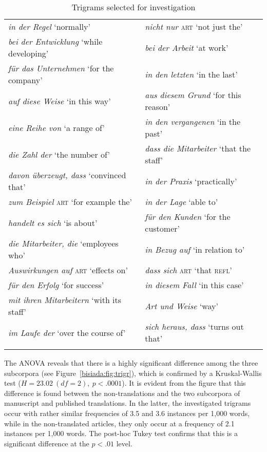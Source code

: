 \documentclass[output=paper]{LSP/langsci}
\begin{document}
\begin{table}
  \caption{Trigrams selected for investigation}\label{bisiada:tab:tgrtab}
  \begin{tabular}{ll}
    \lsptoprule
    \emph{in der Regel} `normally'                      & \emph{nicht nur} \textsc{art} `not just the'\\
    \emph{bei der Entwicklung} `while developing'       & \emph{bei der Arbeit} `at work'\\
    \emph{für das Unternehmen}  `for the company'       & \emph{in den letzten} `in the last'\\
    \emph{auf diese Weise} `in this way'                & \emph{aus diesem Grund} `for this reason'\\
    \emph{eine Reihe von} `a range of'                  & \emph{in den vergangenen} `in the past'\\
    \emph{die Zahl der} `the number of'                 & \emph{dass die Mitarbeiter} `that the staff'\\
    \emph{davon überzeugt, dass} `convinced that'       & \emph{in der Praxis} `practically'\\
    \emph{zum Beispiel} \textsc{art} `for example the'  & \emph{in der Lage} `able to'\\
    \emph{handelt es sich} `is about'                   & \emph{für den Kunden} `for the customer'\\
    \emph{die Mitarbeiter, die} `employees who'         & \emph{in Bezug auf} `in relation to'\\
    \emph{Auswirkungen auf} \textsc{art} `effects on'   & \emph{dass sich} \textsc{art} `that \textsc{refl}'\\
    \emph{für den Erfolg} `for success'                 & \emph{in diesem Fall} `in this case'\\
    \emph{mit ihren Mitarbeitern} `with its staff'      & \emph{Art und Weise} `way'\\
    \emph{im Laufe der} `over the course of'            & \emph{sich heraus, dass} `turns out that'\\
    \lspbottomrule
  \end{tabular}
\end{table}

The ANOVA reveals that there is a highly significant difference among the three subcorpora (see Figure~\ref{bisiada:fig:trigr}), which is confirmed by a Kruskal-Wallis test ($H=23.02~(df=2),~p<.0001$). It is evident from the figure that this difference is found between the non-translations and the two subcorpora of manuscript and published translations. In the latter, the investigated trigrams occur with rather similar frequencies of 3.5 and 3.6 instances per 1,000 words, while in the non-translated articles, they only occur at a frequency of 2.1 instances per 1,000 words. The post-hoc Tukey test confirms that this is a significant difference at the $p<.01$ level.
\end{document}
